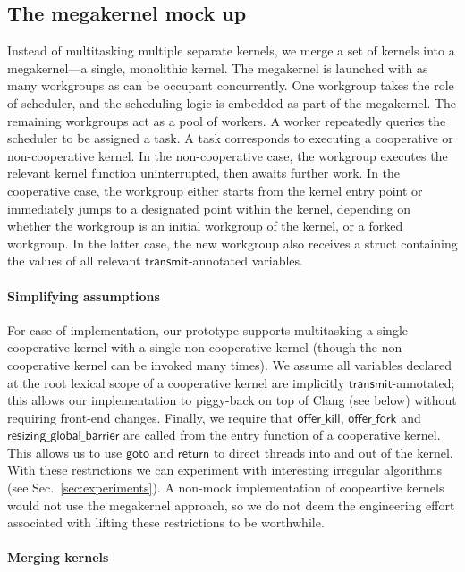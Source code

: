 \documentclass[numbers,nocopyrightspace,10pt]{sigplanconf}
\newcommand{\mysec}{Sec.~}
\newcommand{\transmit}{\mathsf{transmit}}
\newcommand{\offerfork}{\mathsf{offer\_fork}}
\newcommand{\offerkill}{\mathsf{offer\_kill}}
\newcommand{\resizingglobalbarrier}{\mathsf{resizing\_global\_barrier}}
\newcommand{\keyword}[1]{\mathsf{#1}}
\begin{document}
\subsection{The megakernel mock up}\label{sec:megakernel}

Instead of multitasking multiple separate kernels, we merge a set of
kernels into a megakernel---a single, monolithic kernel.  The
megakernel is launched with as many workgroups as can be occupant
concurrently.  One workgroup takes the role of scheduler, and the
scheduling logic is embedded as part of the megakernel.  The remaining
workgroups act as a pool of workers.  A worker repeatedly queries the
scheduler to be assigned a task.  A task corresponds to executing a
cooperative or non-cooperative kernel.  In the non-cooperative case,
the workgroup executes the relevant kernel function uninterrupted,
then awaits further work.  In the cooperative case, the workgroup
either starts from the kernel entry point or immediately jumps to a
designated point within the kernel, depending on whether the workgroup
is an initial workgroup of the kernel, or a forked workgroup.  In the
latter case, the new workgroup also receives a struct containing the
values of all relevant $\transmit$-annotated variables.

\paragraph{Simplifying assumptions}

For ease of implementation, our prototype supports
multitasking a single cooperative kernel with a single non-cooperative
kernel (though the non-cooperative kernel can be invoked many times).
We
assume all variables declared at the root lexical scope of a
cooperative kernel are implicitly $\transmit$-annotated; this allows our
implementation to piggy-back on top of Clang (see below) without
requiring front-end changes.  Finally, we require that $\offerkill$,
$\offerfork$ and $\resizingglobalbarrier$ are called from the entry
function of a cooperative kernel.  This allows us to use
$\keyword{goto}$ and $\keyword{return}$ to direct threads into and out
of the kernel.  With these restrictions we can experiment
with interesting irregular algorithms (see
\mysec\ref{sec:experiments}).  A non-mock implementation of
coopeartive kernels would not use the megakernel approach, so we do not deem
the engineering effort associated with lifting these restrictions to
be worthwhile.

\paragraph{Merging kernels}
\end{document}
